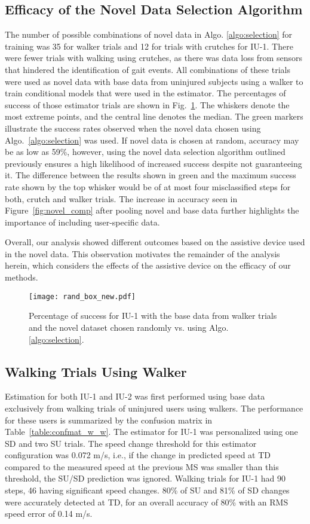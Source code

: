 \subsection{Efficacy of the Novel Data Selection Algorithm}\label{sec:efficacy}

The number of possible combinations of novel data in Algo. \ref{algo:selection} for training was 35 for walker trials and 12 for trials with crutches for IU-1. There were fewer trials with walking using crutches, as there was data loss from sensors that hindered the identification of gait events. All combinations of these trials were used as novel data with base data from uninjured subjects using a walker to train conditional models that were used in the estimator. The percentages of success of those estimator trials are shown in Fig.~\ref{fig:rand_box}. The whiskers denote the most extreme points, and the central line denotes the median. The green markers illustrate the success rates observed when the novel data chosen using Algo.~\ref{algo:selection} was used. If novel data is chosen at random, accuracy may be as low as 59\%, however, using the novel data selection algorithm outlined previously ensures a high likelihood of increased success despite not guaranteeing it. The difference between the results shown in green and the maximum success rate shown by the top whisker would be of at most four misclassified steps for both, crutch and walker trials. The increase in accuracy seen in Figure~\ref{fig:novel_comp} after pooling novel and base data further highlights the importance of including user-specific data.

Overall, our analysis showed different outcomes based on the assistive device used in the novel data. This observation motivates the remainder of the analysis herein, which considers the effects of the assistive device on the efficacy of our methods. 

\begin{figure}
	\centering
	\texttt{[image: rand\_box\_new.pdf]}
	\caption{Percentage of success for IU-1 with the base data from walker trials and the novel dataset chosen randomly vs. using Algo. \ref{algo:selection}.}\label{fig:rand_box}
\end{figure}

\subsection{Walking Trials Using Walker}\label{sec:ww}
Estimation for both IU-1 and IU-2 was first performed using base data exclusively from walking trials of uninjured users using walkers. The performance for these users is summarized by the confusion matrix in Table~\ref{table:confmat_w_w}. The estimator for IU-1 was personalized using one SD and two SU trials. The speed change threshold for this estimator configuration was 0.072 m/s, i.e., if the change in predicted speed at TD compared to the measured speed at the previous MS was smaller than this threshold, the SU/SD prediction was ignored. Walking trials for IU-1 had 90 steps, 46 having significant speed changes. 80\% of SU and 81\% of SD changes were accurately detected at TD, for an overall accuracy of 80\% with an RMS speed error of 0.14 m/s.

